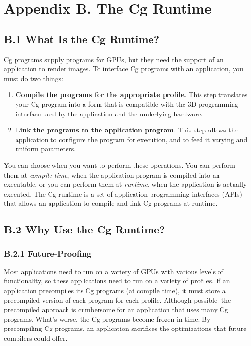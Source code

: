 \documentclass[../main.tex]{subfiles}
\begin{document}
\chapter{Appendix B. The Cg Runtime}

\section{B.1 What Is the Cg Runtime?}

Cg programs supply programs for GPUs, but they need the support of an application to render images. To interface Cg programs with an application, you must do two things:

\begin{enumerate}
\item \textbf{Compile the programs for the appropriate profile.} This step translates your Cg program into a form that is compatible with the 3D programming interface used by the application and the underlying hardware.
\item \textbf{Link the programs to the application program.} This step allows the application to configure the program for execution, and to feed it varying and uniform parameters.
\end{enumerate}

You can choose when you want to perform these operations. You can perform them at \textit{compile time}, when the application program is compiled into an executable, or you can perform them at \textit{runtime}, when the application is actually executed. The Cg runtime is a set of application programming interfaces (APIs) that allows an application to compile and link Cg programs at runtime.

\section{B.2 Why Use the Cg Runtime?}

\subsection{B.2.1 Future-Proofing}

Most applications need to run on a variety of GPUs with various levels of functionality, so these applications need to run on a variety of profiles. If an application precompiles its Cg programs (at compile time), it must store a precompiled version of each program for each profile. Although possible, the precompiled approach is cumbersome for an application that uses many Cg programs. What's worse, the Cg programs become frozen in time. By precompiling Cg programs, an application sacrifices the optimizations that future compilers could offer.
\end{document}
